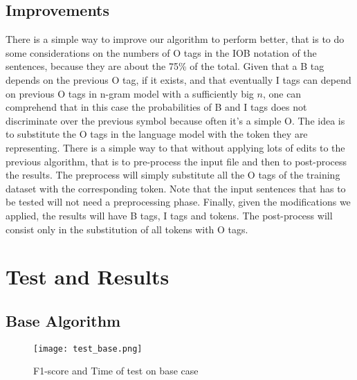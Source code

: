 \documentclass[11pt,a4paper]{article}
\begin{document}
\subsection{Improvements}

There is a simple way to improve our algorithm to perform better, that is to do some considerations on the numbers of O tags in the IOB notation of the sentences, because they are about the 75\% of the total. Given that a B tag depends on the previous O tag, if it exists, and that eventually I tags can depend on previous O tags in n-gram model with a sufficiently big $n$, one can comprehend that in this case the probabilities of B and I tags does not discriminate over the previous symbol because often it's a simple O. The idea is to substitute the O tags in the language model with the token they are representing. There is a simple way to that without applying lots of edits to the previous algorithm, that is to pre-process the input file and then to post-process the results. The preprocess will simply substitute all the O tags of the training dataset with the corresponding token. Note that the input sentences that has to be tested will not need a preprocessing phase. Finally, given the modifications we applied, the results will have B tags, I tags and tokens. The post-process will consist only in the substitution of all tokens with O tags.

\section{Test and Results}

\subsection{Base Algorithm}

\begin{figure*}
  \texttt{[image: test\_base.png]}
  \caption{F1-score and Time of test on base case}
\end{figure*}
\end{document}

